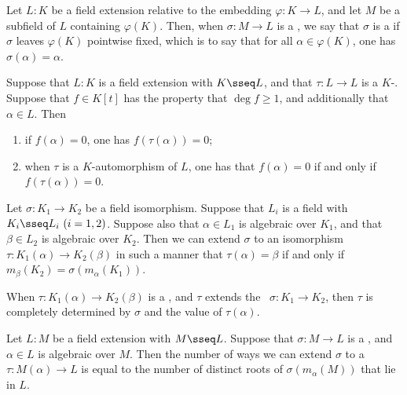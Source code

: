 \documentclass{article}
\begin{document}
  \begin{tdefinition}[\( F \)-\homo]
    Let \(L : K\) be a field extension relative to the embedding \(\varphi : K \to L\), and let \(M\) be a subfield of \(L\) containing \(\varphi(K)\).
    Then, when \(\sigma : M \to L\) is a \homo , we say that \(\sigma\) is a  if \(\sigma\) leaves \(\varphi(K)\) pointwise fixed, which is to say that for all \(\alpha \in \varphi(K)\), one has \( \sigma(\alpha) = \alpha \).
  \end{tdefinition}

  \begin{tproposition}
    Suppose that \( L:K \) is a field extension with \( K\sseq L \), and that \( \tau:L\to L \) is a \( K \)-\homo .
    Suppose that \( f\in K[t] \) has the property that \( \deg f \geq 1 \), and additionally that \( \alpha\in L \).
    Then \begin{enumerate}[label=(\roman*)]
      \item if \( f(\alpha) = 0 \), one has \( f(\tau(\alpha)) = 0 \);
      \item when \( \tau \) is a \( K \)-automorphism of \( L \), one has that \( f(\alpha) = 0 \) if and only if \( f(\tau(\alpha)) = 0 \).
    \end{enumerate}
  \end{tproposition}

  \begin{ttheorem}
    Let \( \sigma :K_1\to K_2 \) be a field isomorphism.
    Suppose that \( L_i \) is a field with \( K_i\sseq L_i\ (i=1,2) \).
    Suppose also that \( \alpha\in L_1 \) is algebraic over \( K_1 \), and that \( \beta\in L_2 \) is algebraic over \( K_2 \).
    Then we can extend \( \sigma \) to an isomorphism \( \tau:K_1(\alpha)\to K_2(\beta) \) in such a manner that \( \tau(\alpha) = \beta \) if and only if \( m_\beta(K_2) = \sigma(m_\alpha(K_1)) \).
  \end{ttheorem}

  \quad When \( \tau:K_1(\alpha)\to K_2(\beta) \) is a \homo, and \( \tau \) extends the \homo~\( \sigma:K_1\to K_2 \), then \( \tau \) is completely determined by \( \sigma \) and the value of \( \tau(\alpha) \).

  \begin{tcorollary}
    Let \( L:M \) be a field extension with \( M\sseq L \).
    Suppose that \( \sigma:M\to L \) is a \homo, and \( \alpha\in L \) is algebraic over \( M \).
    Then the number of ways we can extend \( \sigma \) to a \homo~\( \tau:M(\alpha)\to L \) is equal to the number of distinct roots of \( \sigma(m_\alpha(M)) \) that lie in \( L \).
  \end{tcorollary}
\end{document}
